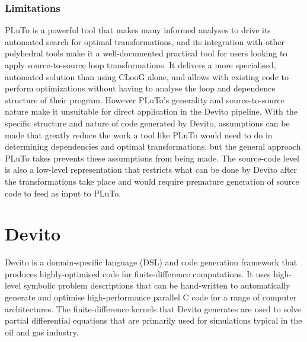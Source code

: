 \documentclass[a4paper,12pt,twoside]{report}
\begin{document}
\subsection*{Limitations}
PLuTo is a powerful tool that makes many informed analyses to drive its automated search for optimal transformations, and its integration
with other polyhedral tools make it a well-documented practical tool for users looking to apply source-to-source loop transformations. It
delivers a more specialised, automated solution than using CLooG alone, and allows with existing code to perform optimizations without having to 
analyse the loop and dependence structure of their program. However
PLuTo's generality and source-to-source nature make it unsuitable for direct application in the Devito pipeline. With the specific structure and
nature of code generated by Devito, assumptions can be made that greatly reduce the work a tool like PLuTo would need to do in determining
dependencies and optimal transformations, but the general approach PLuTo takes prevents these assumptions from being made. The source-code level
is also a low-level representation that restricts what can be done by Devito after the transformations take place and would require premature
generation of source code to feed as input to PLuTo.

\chapter{Devito}
Devito is a domain-specific language (DSL) and code generation framework that produces highly-optimised
code for finite-difference computations. It uses high-level symbolic problem descriptions that can be hand-written to automatically
generate and optimise high-performance parallel C code for a range of computer architectures. The finite-difference kernels that
Devito generates are used to solve partial differential equations that are primarily used for simulations typical in the oil and gas industry.
\end{document}
